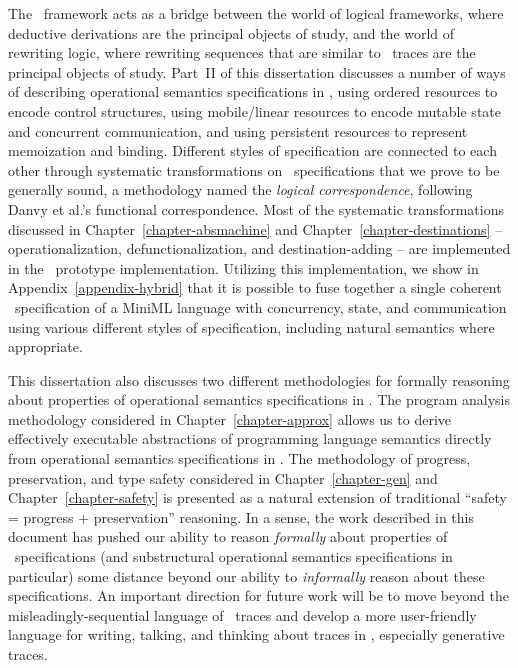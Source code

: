 The \sls~framework acts as a bridge between the world of logical
frameworks, where deductive derivations are the principal objects of
study, and the world of rewriting logic, where rewriting sequences
that are similar to \sls~traces are the principal objects of
study. Part~II of this dissertation discusses a number of ways of
describing operational semantics specifications in \sls, using ordered
resources to encode control structures, using mobile/linear resources
to encode mutable state and concurrent communication, and using
persistent resources to represent memoization and binding. Different
styles of specification are connected to each other through
systematic transformations on \sls~specifications that we prove to be
generally sound, a methodology named the {\it logical correspondence},
following Danvy et al.'s functional correspondence. Most of the
systematic transformations discussed in
Chapter~\ref{chapter-absmachine} and
Chapter~\ref{chapter-destinations} -- operationalization,
defunctionalization, and destination-adding -- are implemented in the
\sls~prototype implementation. Utilizing this implementation, we show
in Appendix~\ref{appendix-hybrid} that it is possible to fuse together
a single coherent \sls~specification of a MiniML language with
concurrency, state, and communication using various different styles
of specification, including natural semantics where appropriate.


This dissertation also discusses two different methodologies for
formally reasoning about properties of operational semantics
specifications in \sls. The program analysis methodology considered in
Chapter~\ref{chapter-approx} allows us to derive effectively
executable abstractions of programming language semantics
directly from operational semantics specifications in \sls. The methodology of
progress, preservation, and type safety considered in
Chapter~\ref{chapter-gen} and Chapter~\ref{chapter-safety} is
presented as a natural extension of traditional ``safety = progress +
preservation'' reasoning. In a sense, the work described in this
document has pushed our ability to reason {\it formally} about
properties of \sls~specifications (and substructural operational
semantics specifications in particular) some distance beyond our
ability to {\it informally} reason about these specifications. An
important direction for future work will be to move beyond the
misleadingly-sequential language of \sls~traces and develop a more
user-friendly language for writing, talking, and thinking about traces
in \sls, especially generative traces.
